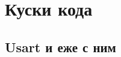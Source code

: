 \documentclass[12pt]{article}
\begin{document}
\section{Куски кода}

\subsection{}
\subsection{}
\subsection{Usart и еже с ним}
\subsection{}
\end{document}

